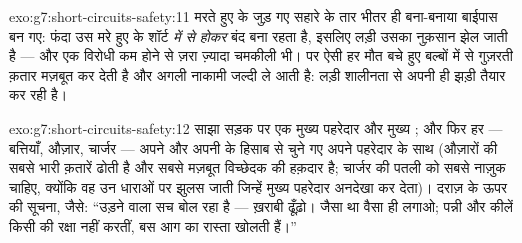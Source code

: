 \begin{solution}{exo:g7:short-circuits-safety:11}
मरते हुए  के जुड़ गए सहारे के तार भीतर ही बना-बनाया बाईपास बन गए:
फंदा उस मरे हुए  के शॉर्ट \emph{में से होकर} बंद बना रहता है,
इसलिए लड़ी उसका नुक़सान झेल जाती है --- और एक विरोधी कम होने से ज़रा
ज़्यादा चमकीली भी। पर ऐसी हर मौत बचे हुए बल्बों में से गुज़रती क़तार
मज़बूत कर देती है और अगली नाकामी जल्दी ले आती है: लड़ी शालीनता से अपनी
ही झड़ी तैयार कर रही है।
\end{solution}

\begin{solution}{exo:g7:short-circuits-safety:12}
साझा सड़क पर एक मुख्य पहरेदार और मुख्य ; और फिर हर  ---
बत्तियाँ, औज़ार, चार्जर --- अपने  और अपनी  के हिसाब से चुने
गए अपने पहरेदार के साथ (औज़ारों की  सबसे भारी क़तारें ढोती है और
सबसे मज़बूत विच्छेदक की हक़दार है; चार्जर की पतली  को सबसे नाज़ुक
 चाहिए, क्योंकि वह उन धाराओं पर झुलस जाती जिन्हें मुख्य पहरेदार
अनदेखा कर देता)। दराज़ के ऊपर की सूचना, जैसे: ``उड़ने वाला  सच
बोल रहा है --- ख़राबी ढूँढ़ो। जैसा था वैसा ही लगाओ; पन्नी और कीलें
किसी की रक्षा नहीं करतीं, बस आग का रास्ता खोलती हैं।''
\end{solution}


